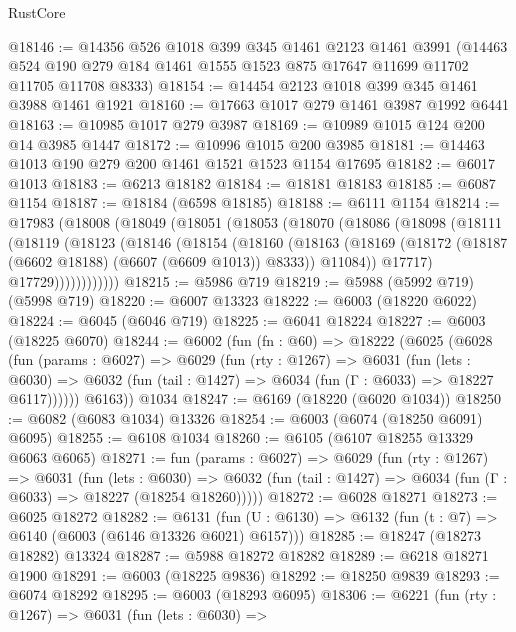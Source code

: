 \begin{lexlean}{RustCore}
\begin{coremodule}
@18146 := @14356
    @526
    @1018
    @399
    @345
    @1461
    @2123
    @1461
    @3991
    (@14463 @524 @190 @279 @184 @1461 @1555 @1523 @875 @17647 @11699 @11702 @11705 @11708 @8333)
@18154 := @14454 @2123 @1018 @399 @345 @1461 @3988 @1461 @1921
@18160 := @17663 @1017 @279 @1461 @3987 @1992 @6441
@18163 := @10985 @1017 @279 @3987
@18169 := @10989 @1015 @124 @200 @14 @3985 @1447
@18172 := @10996 @1015 @200 @3985
@18181 := @14463 @1013 @190 @279 @200 @1461 @1521 @1523 @1154 @17695
@18182 := @6017 @1013
@18183 := @6213 @18182
@18184 := @18181 @18183
@18185 := @6087 @1154
@18187 := @18184 (@6598 @18185)
@18188 := @6111 @1154
@18214 := @17983
    (@18008
      (@18049
        (@18051
          (@18053
            (@18070
              (@18086
                (@18098
                  (@18111
                    (@18119
                      (@18123
                        (@18146
                          (@18154
                            (@18160
                              (@18163
                                (@18169
                                  (@18172 (@18187 (@6602 @18188) (@6607 (@6609 @1013)) @8333))
                                  @11084))
                              @17717)
                            @17729))))))))))))
@18215 := @5986 @719
@18219 := @5988 (@5992 @719) (@5998 @719)
@18220 := @6007 @13323
@18222 := @6003 (@18220 @6022)
@18224 := @6045 (@6046 @719)
@18225 := @6041 @18224
@18227 := @6003 (@18225 @6070)
@18244 := @6002
    (fun (fn : @60) =>
    @18222
      (@6025
        (@6028
          (fun (params : @6027) =>
          @6029
            (fun (rty : @1267) =>
            @6031
              (fun (lets : @6030) =>
              @6032 (fun (tail : @1427) => @6034 (fun (Γ : @6033) => @18227 @6117))))))
        @6163))
    @1034
@18247 := @6169 (@18220 (@6020 @1034))
@18250 := @6082 (@6083 @1034) @13326
@18254 := @6003 (@6074 (@18250 @6091) @6095)
@18255 := @6108 @1034
@18260 := @6105 (@6107 @18255 @13329 @6063 @6065)
@18271 := fun (params : @6027) =>
  @6029
    (fun (rty : @1267) =>
    @6031
      (fun (lets : @6030) =>
      @6032 (fun (tail : @1427) => @6034 (fun (Γ : @6033) => @18227 (@18254 @18260)))))
@18272 := @6028 @18271
@18273 := @6025 @18272
@18282 := @6131
    (fun (U : @6130) => @6132 (fun (t : @7) => @6140 (@6003 (@6146 @13326 @6021) @6157)))
@18285 := @18247 (@18273 @18282) @13324
@18287 := @5988 @18272 @18282
@18289 := @6218 @18271 @1900
@18291 := @6003 (@18225 @9836)
@18292 := @18250 @9839
@18293 := @6074 @18292
@18295 := @6003 (@18293 @6095)
@18306 := @6221
    (fun (rty : @1267) =>
    @6031
      (fun (lets : @6030) =>

\end{coremodule}
\end{lexlean}
